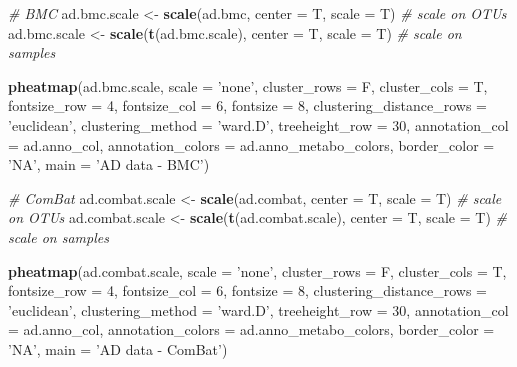 \documentclass[]{book}
\newenvironment{Shaded}{\begin{snugshade}}{\end{snugshade}}
\newcommand{\KeywordTok}[1]{\textcolor[rgb]{0.13,0.29,0.53}{\textbf{#1}}}
\newcommand{\DataTypeTok}[1]{\textcolor[rgb]{0.13,0.29,0.53}{#1}}
\newcommand{\DecValTok}[1]{\textcolor[rgb]{0.00,0.00,0.81}{#1}}
\newcommand{\StringTok}[1]{\textcolor[rgb]{0.31,0.60,0.02}{#1}}
\newcommand{\CommentTok}[1]{\textcolor[rgb]{0.56,0.35,0.01}{\textit{#1}}}
\newcommand{\NormalTok}[1]{#1}
\begin{document}
\begin{Shaded}
\begin{Highlighting}[]
\CommentTok{# BMC}
\NormalTok{ad.bmc.scale <-}\StringTok{ }\KeywordTok{scale}\NormalTok{(ad.bmc, }\DataTypeTok{center =}\NormalTok{ T, }\DataTypeTok{scale =}\NormalTok{ T) }\CommentTok{# scale on OTUs}
\NormalTok{ad.bmc.scale <-}\StringTok{ }\KeywordTok{scale}\NormalTok{(}\KeywordTok{t}\NormalTok{(ad.bmc.scale), }\DataTypeTok{center =}\NormalTok{ T, }\DataTypeTok{scale =}\NormalTok{ T) }\CommentTok{# scale on samples}

\KeywordTok{pheatmap}\NormalTok{(ad.bmc.scale, }
         \DataTypeTok{scale =} \StringTok{'none'}\NormalTok{, }
         \DataTypeTok{cluster_rows =}\NormalTok{ F, }
         \DataTypeTok{cluster_cols =}\NormalTok{ T, }
         \DataTypeTok{fontsize_row =} \DecValTok{4}\NormalTok{, }\DataTypeTok{fontsize_col =} \DecValTok{6}\NormalTok{,}
         \DataTypeTok{fontsize =} \DecValTok{8}\NormalTok{,}
         \DataTypeTok{clustering_distance_rows =} \StringTok{'euclidean'}\NormalTok{,}
         \DataTypeTok{clustering_method =} \StringTok{'ward.D'}\NormalTok{,}
         \DataTypeTok{treeheight_row =} \DecValTok{30}\NormalTok{,}
         \DataTypeTok{annotation_col =}\NormalTok{ ad.anno_col,}
         \DataTypeTok{annotation_colors =}\NormalTok{ ad.anno_metabo_colors,}
         \DataTypeTok{border_color =} \StringTok{'NA'}\NormalTok{,}
         \DataTypeTok{main =} \StringTok{'AD data - BMC'}\NormalTok{)}

\CommentTok{# ComBat}
\NormalTok{ad.combat.scale <-}\StringTok{ }\KeywordTok{scale}\NormalTok{(ad.combat, }\DataTypeTok{center =}\NormalTok{ T, }\DataTypeTok{scale =}\NormalTok{ T) }\CommentTok{# scale on OTUs}
\NormalTok{ad.combat.scale <-}\StringTok{ }\KeywordTok{scale}\NormalTok{(}\KeywordTok{t}\NormalTok{(ad.combat.scale), }\DataTypeTok{center =}\NormalTok{ T, }\DataTypeTok{scale =}\NormalTok{ T) }\CommentTok{# scale on samples}

\KeywordTok{pheatmap}\NormalTok{(ad.combat.scale, }
         \DataTypeTok{scale =} \StringTok{'none'}\NormalTok{, }
         \DataTypeTok{cluster_rows =}\NormalTok{ F, }
         \DataTypeTok{cluster_cols =}\NormalTok{ T, }
         \DataTypeTok{fontsize_row =} \DecValTok{4}\NormalTok{, }\DataTypeTok{fontsize_col =} \DecValTok{6}\NormalTok{,}
         \DataTypeTok{fontsize =} \DecValTok{8}\NormalTok{,}
         \DataTypeTok{clustering_distance_rows =} \StringTok{'euclidean'}\NormalTok{,}
         \DataTypeTok{clustering_method =} \StringTok{'ward.D'}\NormalTok{,}
         \DataTypeTok{treeheight_row =} \DecValTok{30}\NormalTok{,}
         \DataTypeTok{annotation_col =}\NormalTok{ ad.anno_col,}
         \DataTypeTok{annotation_colors =}\NormalTok{ ad.anno_metabo_colors,}
         \DataTypeTok{border_color =} \StringTok{'NA'}\NormalTok{,}
         \DataTypeTok{main =} \StringTok{'AD data - ComBat'}\NormalTok{)}




\end{Highlighting}
\end{Shaded}
\end{document}
